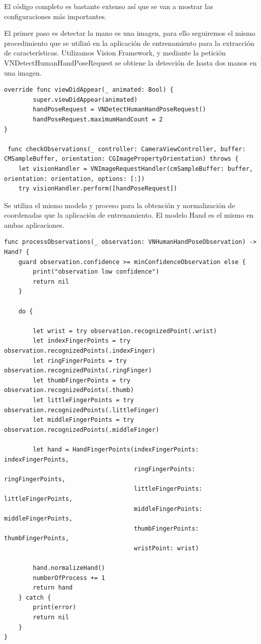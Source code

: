 \documentclass[../main.tex]{subfiles}
\begin{document}
El código completo es bastante extenso así que se van a mostrar las configuraciones más importantes.

El primer paso es detectar la mano es una imagen, para ello seguiremos el mismo procedimiento que se utilizó en la aplicación de entrenamiento para la extracción de características. Utilizamos Vision Framework, y mediante la petición VNDetectHumanHandPoseRequest se obtiene la detección de hasta dos manos en una imagen.

\begin{lstlisting}[style=swift]
override func viewDidAppear(_ animated: Bool) {
        super.viewDidAppear(animated)
        handPoseRequest = VNDetectHumanHandPoseRequest()
        handPoseRequest.maximumHandCount = 2
}
   
 func checkObservations(_ controller: CameraViewController, buffer: CMSampleBuffer, orientation: CGImagePropertyOrientation) throws {
    let visionHandler = VNImageRequestHandler(cmSampleBuffer: buffer, orientation: orientation, options: [:])
    try visionHandler.perform([handPoseRequest]) 
\end{lstlisting}

Se utiliza el mismo modelo y proceso para la obtención y normalización de coordenadas que la aplicación de entrenamiento. El modelo Hand es el mismo en ambas aplicaciones.  
\begin{lstlisting}[style=swift]
func processObservations(_ observation: VNHumanHandPoseObservation) -> Hand? {
    guard observation.confidence >= minConfidenceObservation else {
        print("observation low confidence")
        return nil
    }
    
    do {
           
        let wrist = try observation.recognizedPoint(.wrist)
        let indexFingerPoints = try observation.recognizedPoints(.indexFinger)
        let ringFingerPoints = try observation.recognizedPoints(.ringFinger)
        let thumbFingerPoints = try observation.recognizedPoints(.thumb)
        let littleFingerPoints = try observation.recognizedPoints(.littleFinger)
        let middleFingerPoints = try observation.recognizedPoints(.middleFinger)
        
        let hand = HandFingerPoints(indexFingerPoints: indexFingerPoints,
                                    ringFingerPoints: ringFingerPoints,
                                    littleFingerPoints: littleFingerPoints,
                                    middleFingerPoints: middleFingerPoints,
                                    thumbFingerPoints: thumbFingerPoints,
                                    wristPoint: wrist)
        
        hand.normalizeHand()
        numberOfProcess += 1
        return hand
    } catch {
        print(error)
        return nil
    }
}
\end{lstlisting}
\end{document}
